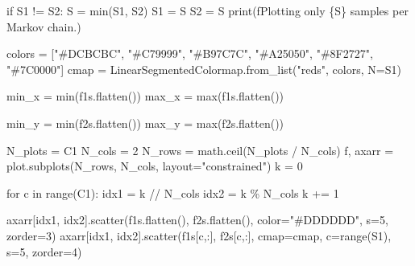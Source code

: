 \documentclass[
  letterpaper,
  DIV=11,
  numbers=noendperiod]{scrartcl}
\newenvironment{Shaded}{\begin{snugshade}}{\end{snugshade}}
\newcommand{\BuiltInTok}[1]{\textcolor[rgb]{0.00,0.23,0.31}{#1}}
\newcommand{\ControlFlowTok}[1]{\textcolor[rgb]{0.00,0.23,0.31}{#1}}
\newcommand{\DecValTok}[1]{\textcolor[rgb]{0.68,0.00,0.00}{#1}}
\newcommand{\KeywordTok}[1]{\textcolor[rgb]{0.00,0.23,0.31}{#1}}
\newcommand{\NormalTok}[1]{\textcolor[rgb]{0.00,0.23,0.31}{#1}}
\newcommand{\OperatorTok}[1]{\textcolor[rgb]{0.37,0.37,0.37}{#1}}
\newcommand{\SpecialCharTok}[1]{\textcolor[rgb]{0.37,0.37,0.37}{#1}}
\newcommand{\SpecialStringTok}[1]{\textcolor[rgb]{0.13,0.47,0.30}{#1}}
\newcommand{\StringTok}[1]{\textcolor[rgb]{0.13,0.47,0.30}{#1}}
\begin{document}
\begin{Shaded}
\begin{Highlighting}[]
  \ControlFlowTok{if}\NormalTok{ S1 }\OperatorTok{!=}\NormalTok{ S2:}
\NormalTok{    S }\OperatorTok{=} \BuiltInTok{min}\NormalTok{(S1, S2)}
\NormalTok{    S1 }\OperatorTok{=}\NormalTok{ S}
\NormalTok{    S2 }\OperatorTok{=}\NormalTok{ S}
    \BuiltInTok{print}\NormalTok{(}\SpecialStringTok{f\textquotesingle{}Plotting only }\SpecialCharTok{\{}\NormalTok{S}\SpecialCharTok{\}}\SpecialStringTok{ samples per Markov chain.\textquotesingle{}}\NormalTok{)}
  
\NormalTok{  colors }\OperatorTok{=}\NormalTok{ [}\StringTok{"\#DCBCBC"}\NormalTok{, }\StringTok{"\#C79999"}\NormalTok{, }\StringTok{"\#B97C7C"}\NormalTok{,}
            \StringTok{"\#A25050"}\NormalTok{, }\StringTok{"\#8F2727"}\NormalTok{, }\StringTok{"\#7C0000"}\NormalTok{]}
\NormalTok{  cmap }\OperatorTok{=}\NormalTok{ LinearSegmentedColormap.from\_list(}\StringTok{"reds"}\NormalTok{, colors, N}\OperatorTok{=}\NormalTok{S1)}
  
\NormalTok{  min\_x }\OperatorTok{=} \BuiltInTok{min}\NormalTok{(f1s.flatten())}
\NormalTok{  max\_x }\OperatorTok{=} \BuiltInTok{max}\NormalTok{(f1s.flatten())}
  
\NormalTok{  min\_y }\OperatorTok{=} \BuiltInTok{min}\NormalTok{(f2s.flatten())}
\NormalTok{  max\_y }\OperatorTok{=} \BuiltInTok{max}\NormalTok{(f2s.flatten())}
  
\NormalTok{  N\_plots }\OperatorTok{=}\NormalTok{ C1}
\NormalTok{  N\_cols }\OperatorTok{=} \DecValTok{2}
\NormalTok{  N\_rows }\OperatorTok{=}\NormalTok{ math.ceil(N\_plots }\OperatorTok{/}\NormalTok{ N\_cols)}
\NormalTok{  f, axarr }\OperatorTok{=}\NormalTok{ plot.subplots(N\_rows, N\_cols, layout}\OperatorTok{=}\StringTok{"constrained"}\NormalTok{)}
\NormalTok{  k }\OperatorTok{=} \DecValTok{0}
  
  \ControlFlowTok{for}\NormalTok{ c }\KeywordTok{in} \BuiltInTok{range}\NormalTok{(C1):}
\NormalTok{    idx1 }\OperatorTok{=}\NormalTok{ k }\OperatorTok{//}\NormalTok{ N\_cols}
\NormalTok{    idx2 }\OperatorTok{=}\NormalTok{ k }\OperatorTok{\%}\NormalTok{ N\_cols}
\NormalTok{    k }\OperatorTok{+=} \DecValTok{1}
    
\NormalTok{    axarr[idx1, idx2].scatter(f1s.flatten(), f2s.flatten(),}
\NormalTok{                              color}\OperatorTok{=}\StringTok{"\#DDDDDD"}\NormalTok{, s}\OperatorTok{=}\DecValTok{5}\NormalTok{, zorder}\OperatorTok{=}\DecValTok{3}\NormalTok{)}
\NormalTok{    axarr[idx1, idx2].scatter(f1s[c,:], f2s[c,:],}
\NormalTok{                              cmap}\OperatorTok{=}\NormalTok{cmap, c}\OperatorTok{=}\BuiltInTok{range}\NormalTok{(S1), s}\OperatorTok{=}\DecValTok{5}\NormalTok{, zorder}\OperatorTok{=}\DecValTok{4}\NormalTok{)}
    

\end{Highlighting}
\end{Shaded}
\end{document}
